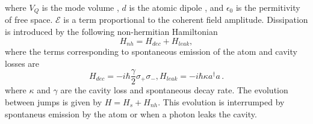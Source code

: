 \documentclass[conference]{IEEEtran}
\begin{document}
where $V_Q$ is the mode volume , $d$ is the atomic dipole , and
$\epsilon_0$ is the permitivity of free space. $\mathcal{E}$ is a term
proportional to the coherent field amplitude. Dissipation is
introduced by the following non-hermitian Hamiltonian
\begin{equation} \label{nh}
H_{nh} = H_{dec} + H_{leak},
\end{equation}
where the terms corresponding to spontaneous emission of the atom and cavity losses are
\begin{subequations}
\begin{equation}
H_{dec} = - i\hbar\frac{\gamma}{2}\sigma_+\sigma_-,
\end{equation}
\begin{equation}
H_{leak} = - i\hbar\kappa a^\dagger a\, .
\end{equation}
\end{subequations}
where $\kappa$ and $\gamma$ are the cavity loss and spontaneous decay
rate. The evolution between jumps is given by $H=H_s+H_{nh}$. This
evolution is interrumped by spontaneus emission by the atom or when a
photon leaks the cavity. 
\end{document}
